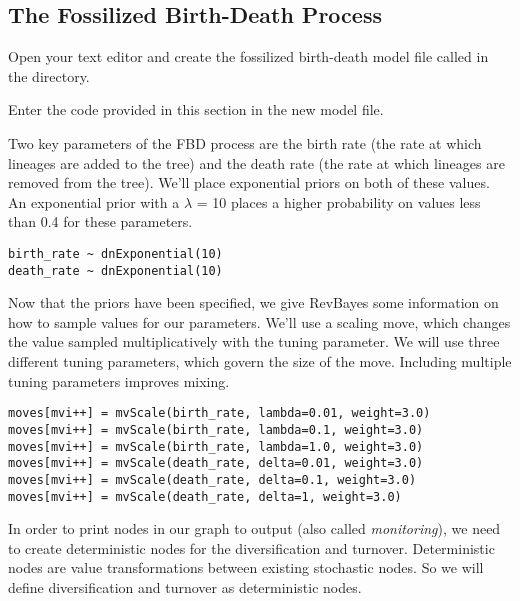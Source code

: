 \bigskip

\subsection{The Fossilized Birth-Death Process}\label{sect:ModelFBD}

{\begin{framed}
Open your text editor and create the fossilized birth-death model file called {\textcolor{red}{}} in the  directory.

Enter the \Rev code provided in this section in the new model file.
\end{framed}}

Two key parameters of the FBD process are the birth rate (the rate at which lineages are added to the tree) and the death rate (the rate at which lineages are removed from the tree). We'll place exponential priors on both of these values. An exponential prior with a $\lambda$ =  10 places a higher probability on values less than 0.4 for these parameters. 

{\tt \begin{snugshade*}
\begin{lstlisting}
birth_rate ~ dnExponential(10)
death_rate ~ dnExponential(10)
\end{lstlisting}
\end{snugshade*}}

Now that the priors have been specified, we give RevBayes some information on how to sample values for our parameters. We'll use a scaling move, which changes the value sampled multiplicatively with the tuning parameter. We will use three different tuning parameters, which govern the size of the move. Including multiple tuning parameters improves mixing. 

{\tt \begin{snugshade*}
\begin{lstlisting}
moves[mvi++] = mvScale(birth_rate, lambda=0.01, weight=3.0)
moves[mvi++] = mvScale(birth_rate, lambda=0.1, weight=3.0)
moves[mvi++] = mvScale(birth_rate, lambda=1.0, weight=3.0)
moves[mvi++] = mvScale(death_rate, delta=0.01, weight=3.0)
moves[mvi++] = mvScale(death_rate, delta=0.1, weight=3.0)
moves[mvi++] = mvScale(death_rate, delta=1, weight=3.0)
\end{lstlisting}
\end{snugshade*}}

In order to print nodes in our graph to output (also called \textit{monitoring}), we need to create deterministic nodes for the diversification and turnover. Deterministic nodes are value transformations between existing stochastic nodes. So we will define diversification and turnover as deterministic nodes.

